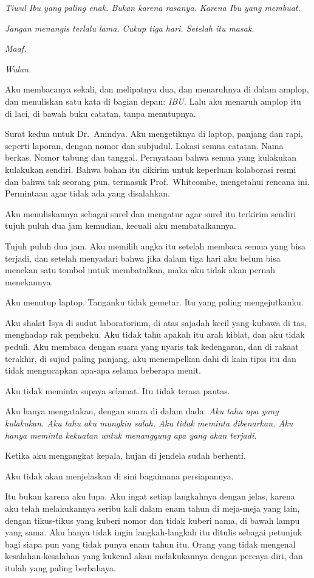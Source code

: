 \documentclass[11pt,twoside,openany]{book}
\makeatletter
\newcommand{\scenebreak}{\par\vspace{0.9em}{\centering\textsc{*\hspace{0.7em}*\hspace{0.7em}*}\par}\vspace{0.9em}\@afterindentfalse\@afterheading}
\makeatother
\begin{document}
\emph{Tiwul Ibu yang paling enak. Bukan karena rasanya. Karena Ibu yang membuat.}

\emph{Jangan menangis terlalu lama. Cukup tiga hari. Setelah itu masak.}

\emph{Maaf.}

\emph{Wulan.}

Aku membacanya sekali, dan melipatnya dua, dan menaruhnya di dalam amplop, dan menuliskan satu kata di bagian depan: \emph{IBU.} Lalu aku menaruh amplop itu di laci, di bawah buku catatan, tanpa menutupnya.

Surat kedua untuk Dr.~Anindya. Aku mengetiknya di laptop, panjang dan rapi, seperti laporan, dengan nomor dan subjudul. Lokasi semua catatan. Nama berkas. Nomor tabung dan tanggal. Pernyataan bahwa semua yang kulakukan kulakukan sendiri. Bahwa bahan itu dikirim untuk keperluan kolaborasi resmi dan bahwa tak seorang pun, termasuk Prof.~Whitcombe, mengetahui rencana ini. Permintaan agar tidak ada yang disalahkan.

Aku menuliskannya sebagai surel dan mengatur agar surel itu terkirim sendiri tujuh puluh dua jam kemudian, kecuali aku membatalkannya.

Tujuh puluh dua jam. Aku memilih angka itu setelah membaca semua yang bisa terjadi, dan setelah menyadari bahwa jika dalam tiga hari aku belum bisa menekan satu tombol untuk membatalkan, maka aku tidak akan pernah menekannya.

Aku menutup laptop. Tanganku tidak gemetar. Itu yang paling mengejutkanku.

\scenebreak
Aku shalat Isya di sudut laboratorium, di atas sajadah kecil yang kubawa di tas, menghadap rak pembeku. Aku tidak tahu apakah itu arah kiblat, dan aku tidak peduli. Aku membaca dengan suara yang nyaris tak kedengaran, dan di rakaat terakhir, di sujud paling panjang, aku menempelkan dahi di kain tipis itu dan tidak mengucapkan apa-apa selama beberapa menit.

Aku tidak meminta supaya selamat. Itu tidak terasa pantas.

Aku hanya mengatakan, dengan suara di dalam dada: \emph{Aku tahu apa yang kulakukan. Aku tahu aku mungkin salah. Aku tidak meminta dibenarkan. Aku hanya meminta kekuatan untuk menanggung apa yang akan terjadi.}

Ketika aku mengangkat kepala, hujan di jendela sudah berhenti.

\scenebreak
Aku tidak akan menjelaskan di sini bagaimana persiapannya.

Itu bukan karena aku lupa. Aku ingat setiap langkahnya dengan jelas, karena aku telah melakukannya seribu kali dalam enam tahun di meja-meja yang lain, dengan tikus-tikus yang kuberi nomor dan tidak kuberi nama, di bawah lampu yang sama. Aku hanya tidak ingin langkah-langkah itu ditulis sebagai petunjuk bagi siapa pun yang tidak punya enam tahun itu. Orang yang tidak mengenal kesalahan-kesalahan yang kukenal akan melakukannya dengan percaya diri, dan itulah yang paling berbahaya.
\end{document}
